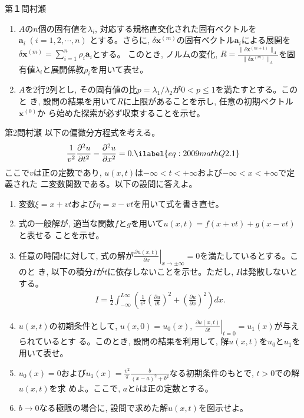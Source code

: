 \begin{question}{第１問}{村瀬}
\begin{enumerate}
\item{}
  $A$の$n$個の固有値を$\lambda_i$, 対応する規格直交化された固有ベクトルを$\bm{a}_i\;(i=1,2,\cdots,n)$
  とする。さらに, $\delta\bm{x}^{(m)}$の固有ベクトル$\bm{a}_i$による展開を$\delta\bm{x}^{(m)}=\sum_{i=1}^n\rho_i\bm{a}_i$とする。
  このとき, ノルムの変化, $R=\frac{\|\delta\bm{x}^{(m+1)}\|_A}{\|\delta\bm{x}^{(m)}\|_A}$を固有値$\lambda_i$と展開係教$\rho_i$を用いて表せ。

\item
  $A$を2行2列とし, その固有値の比$p=\lambda_1/\lambda_2$が$0<p\le 1$を満たすとする。このと
  き, 設問の結果を用いて$R$に上限があることを示し, 任意の初期ベクトル$\bm{x}^{(0)}$か
  ら始めた探索が必ず収束することを示せ。

\end{enumerate}
\end{question}

\begin{question}{第2問}{村瀬}
以下の偏微分方程式を考える。
\begin{align}
  \frac1{v^2}\frac{\partial^2 u}{\partial t^2} - \frac{\partial^2 u}{\partial x^2} = 0. \ilabel{eq:2009mathQ2.1}
\end{align}
ここで$v$は正の定数であり, $u(x,t)$は$-\infty<t<+\infty$および$-\infty<x<+\infty$で定義された
二変数関数である。以下の設問に答えよ。

\begin{enumerate}
\item
  変数$\xi=x+vt$および$\eta=x-vt$を用いて式を書き直せ。

\item{}
  式の一般解が, 適当な関数$f$と$g$を用いて$u(x,t)=f(x+vt)+g(x-vt)$と表せる
  ことを示せ。

\item
  任意の時間$t$に対して, 式の解が$\left.\frac{\partial u(x,t)}{\partial x}\right|_{x\to\pm\infty}=0$を満たしているとする。このと
  き, 以下の積分$I$が$t$に依存しないことを示せ。ただし, $I$は発散しないとする。
  \begin{align*}
    I =\frac12\int_{-\infty}^{L\infty}\left(
      \frac1{v^2}\left(\frac{\partial u}{\partial t}\right)^2
      + \left(\frac{\partial u}{\partial x}\right)^2
    \right)dx.
  \end{align*}

\item
  $u(x,t)$の初期条件として, $u(x,0)=u_0(x),\, \left.\frac{\partial u(x,t)}{\partial t}\right|_{t=0}=u_1(x)$が与えられているとす
  る。このとき, 設問の結果を利用して, 解$u(x,t)$を$u_0$と$u_1$を用いて表せ。

\item{}
  $u_0(x)=0$および$u_1(x)=\frac{v^2}{\pi}\frac{b}{(x-a)^2+b^2}$なる初期条件のもとで, $t>0$での解$u(x,t)$を求
  めよ。ここで, $a$と$b$は正の定数とする。

\item
  $b\to0$なる極限の場合に, 設問で求めた解$u(x,t)$を図示せよ。

\end{enumerate}
\end{question}
